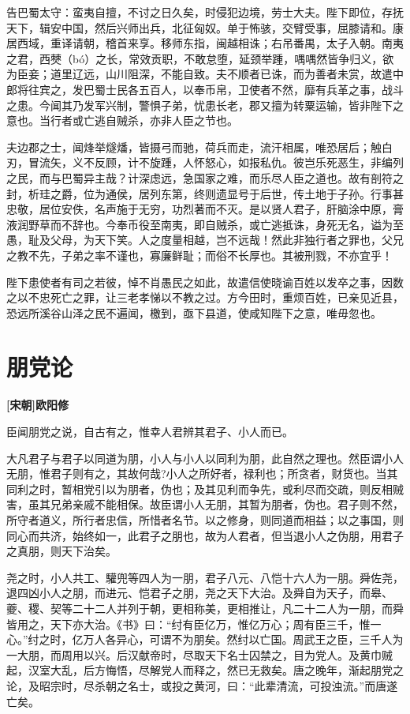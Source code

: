 \documentclass[UTF8,titlepage,oneside]{ctexbook}
\begin{document}
告巴蜀太守：蛮夷自擅，不讨之日久矣，时侵犯边境，劳士大夫。陛下即位，存抚天下，辑安中国，然后兴师出兵，北征匈奴。单于怖骇，交臂受事，屈膝请和。康居西域，重译请朝，稽首来享。移师东指，闽越相诛；右吊番禺，太子入朝。南夷之君，西僰（bó）之长，常效贡职，不敢怠堕，延颈举踵，喁喁然皆争归义，欲为臣妾；道里辽远，山川阻深，不能自致。夫不顺者已诛，而为善者未赏，故遣中郎将往宾之，发巴蜀士民各五百人，以奉币帛，卫使者不然，靡有兵革之事，战斗之患。今闻其乃发军兴制，警惧子弟，忧患长老，郡又擅为转粟运输，皆非陛下之意也。当行者或亡逃自贼杀，亦非人臣之节也。


夫边郡之士，闻烽举燧燔，皆摄弓而驰，荷兵而走，流汗相属，唯恐居后；触白刃，冒流矢，义不反顾，计不旋踵，人怀怒心，如报私仇。彼岂乐死恶生，非编列之民，而与巴蜀异主哉？计深虑远，急国家之难，而乐尽人臣之道也。故有剖符之封，析珪之爵，位为通侯，居列东第，终则遗显号于后世，传土地于子孙。行事甚忠敬，居位安佚，名声施于无穷，功烈著而不灭。是以贤人君子，肝脑涂中原，膏液润野草而不辞也。今奉币役至南夷，即自贼杀，或亡逃抵诛，身死无名，谥为至愚，耻及父母，为天下笑。人之度量相越，岂不远哉！然此非独行者之罪也，父兄之教不先，子弟之率不谨也，寡廉鲜耻；而俗不长厚也。其被刑戮，不亦宜乎！


陛下患使者有司之若彼，悼不肖愚民之如此，故遣信使晓谕百姓以发卒之事，因数之以不忠死亡之罪，让三老孝悌以不教之过。方今田时，重烦百姓，已亲见近县，恐远所溪谷山泽之民不遍闻，檄到，亟下县道，使咸知陛下之意，唯毋忽也。



\chapter*{朋党论}
\begin{center}
	\textbf{[宋朝]欧阳修}
\end{center}

臣闻朋党之说，自古有之，惟幸人君辨其君子、小人而已。


大凡君子与君子以同道为朋，小人与小人以同利为朋，此自然之理也。然臣谓小人无朋，惟君子则有之，其故何哉?小人之所好者，禄利也；所贪者，财货也。当其同利之时，暂相党引以为朋者，伪也；及其见利而争先，或利尽而交疏，则反相贼害，虽其兄弟亲戚不能相保。故臣谓小人无朋，其暂为朋者，伪也。君子则不然，所守者道义，所行者忠信，所惜者名节。以之修身，则同道而相益；以之事国，则同心而共济，始终如一，此君子之朋也，故为人君者，但当退小人之伪朋，用君子之真朋，则天下治矣。


尧之时，小人共工、驩兜等四人为一朋，君子八元、八恺十六人为一朋。舜佐尧，退四凶小人之朋，而进元、恺君子之朋，尧之天下大治。及舜自为天子，而皋、夔、稷、契等二十二人并列于朝，更相称美，更相推让，凡二十二人为一朋，而舜皆用之，天下亦大治。《书》曰：“纣有臣亿万，惟亿万心；周有臣三千，惟一心。”纣之时，亿万人各异心，可谓不为朋矣。然纣以亡国。周武王之臣，三千人为一大朋，而周用以兴。后汉献帝时，尽取天下名士囚禁之，目为党人。及黄巾贼起，汉室大乱，后方悔悟，尽解党人而释之，然已无救矣。唐之晚年，渐起朋党之论，及昭宗时，尽杀朝之名士，或投之黄河，曰：“此辈清流，可投浊流。”而唐遂亡矣。
\end{document}
